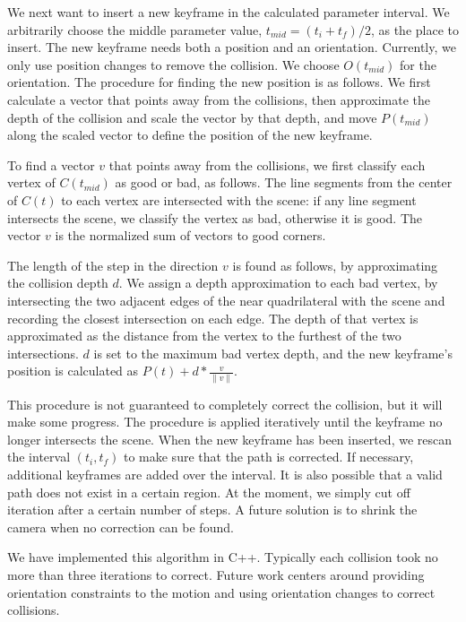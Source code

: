 \documentclass{sig-alternate}
\begin{document}
We next want to insert a new keyframe in the calculated parameter interval.
We arbitrarily choose the middle parameter value, $t_{mid} = (t_i + t_f)/2$,
as the place to insert.
The new keyframe needs both a position and an orientation.
Currently, we only use position changes to remove the collision.
We choose $O(t_{mid})$ for the orientation.
The procedure for finding the new position is as follows.
We first calculate a vector that points away from the collisions,
then approximate the depth of the collision and scale the vector by that 
depth, and move $P(t_{mid})$ along the scaled vector to define the position
of the new keyframe.

To find a vector $v$ that points away from the collisions, we first
classify each vertex of $C(t_{mid})$ as good or bad, as follows.
The line segments from the center of $C(t)$ to each vertex are
intersected with the scene: 
if any line segment intersects the scene, we classify the vertex as bad,
otherwise it is good.
The vector $v$ is the normalized sum of vectors to good corners.

The length of the step in the direction $v$ is found as follows,
by approximating the collision depth $d$.
We assign a depth approximation to each bad vertex, 
by intersecting the two adjacent edges of the near 
quadrilateral with the scene and recording the closest intersection on each edge.
The depth of that vertex is approximated as the distance from the vertex to the
furthest of the two intersections.
$d$ is set to the maximum bad vertex depth, and
the new keyframe's position is calculated as $P(t) + d*\frac{v}{\|v\|}$.

This procedure is not guaranteed to completely correct the collision,
but it will make some progress.
The procedure is applied iteratively until the keyframe no longer
intersects the scene.
When the new keyframe has been inserted, we rescan the interval $(t_i,t_f)$ 
to make sure that the path is corrected.  
If necessary, additional keyframes are added over the interval.
It is also possible that a valid path does not exist in a certain region.
At the moment, we simply cut off iteration after a certain number of steps.
A future solution is to shrink the camera when no correction can be found.

We have implemented this algorithm in C++.
Typically each collision took no more than three iterations to correct.
Future work centers around providing orientation constraints to the motion and
using orientation changes to correct collisions. 
\end{document}

